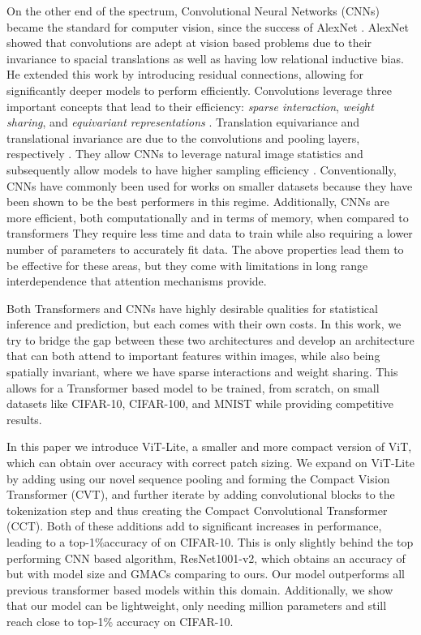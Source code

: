 \documentclass[10pt,twocolumn,letterpaper]{article}
\begin{document}
On the other end of the spectrum, Convolutional Neural Networks (CNNs) \cite{lecun1989backpropagation} became the standard for computer vision, since the success of AlexNet \cite{krizhevsky2012imagenet}. AlexNet showed that convolutions are adept at vision based problems due to their invariance to spacial translations as well as having low relational inductive bias. He \etal \cite{he2016deep} extended this work by introducing residual connections, allowing for significantly deeper models to perform efficiently. Convolutions leverage three important concepts that lead to their efficiency: \textit{sparse interaction}, \textit{weight sharing}, and \textit{equivariant representations} \cite{goodfellow2016deep}. Translation equivariance and translational invariance are due to the convolutions and pooling layers, respectively \cite{goodfellow2016deep,schmidhuber2015deep}. They allow CNNs to leverage natural image statistics and subsequently allow models to have higher sampling efficiency \cite{ruderman1994statistics,ruderman1994statistics}. 
Conventionally, CNNs have commonly been used for works on smaller datasets because they have been shown to be the best performers in this regime. 
Additionally, CNNs are more efficient, both computationally and in terms of memory, when compared to transformers They require less time and data to train while also requiring a lower number of parameters to accurately fit data. 
The above properties lead them to be effective for these areas, but they come with limitations in long range interdependence that attention mechanisms provide.


Both Transformers and CNNs have highly desirable qualities for statistical inference and prediction, but each comes with their own costs. In this work, we try to bridge the gap between these two architectures and develop an architecture that can both attend to important features within images, while also being spatially invariant, where we have sparse interactions and weight sharing. This allows for a Transformer based model to be trained, from scratch, on small datasets like CIFAR-10, CIFAR-100, and MNIST while providing competitive results.

In this paper we introduce ViT-Lite, a smaller and more compact version of ViT, which can obtain over  accuracy with correct patch sizing.
We expand on ViT-Lite by adding using our novel sequence pooling and forming the Compact Vision Transformer (CVT), and further iterate by adding convolutional blocks to the tokenization step and thus creating the Compact Convolutional Transformer (CCT). 
Both of these additions add to significant increases in performance, leading to a top-1\%accuracy of  on CIFAR-10. 
This is only slightly behind the top performing CNN based algorithm, ResNet1001-v2, which obtains an accuracy of  but with  model size and  GMACs comparing to ours.
Our model outperforms all previous transformer based models within this domain. 
Additionally, we show that our model can be lightweight, only needing  million parameters and still reach close to  top-1\% accuracy on CIFAR-10.
\end{document}
